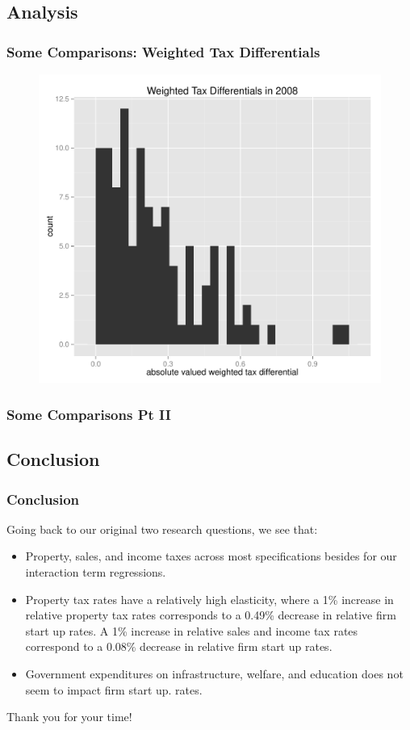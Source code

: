 \documentclass{beamer}
\begin{document}
\begin{frame}
\section{Analysis}
\frametitle{Some Comparisons: Weighted Tax Differentials}
\begin{figure}[h]\label{weightedtax}
    \centering
    \includegraphics[scale = 0.5]{../../analysis/output/_--_weightedtax.pdf}
\end{figure}
\end{frame}

\begin{frame}
\frametitle{Some Comparisons Pt II}



\end{frame}

\begin{frame}
\section{Conclusion}
\frametitle{Conclusion}
Going back to our original two research questions, we see that:
\begin{itemize}
\item Property, sales, and income taxes across most specifications besides for our interaction term regressions. 
\item Property tax rates have a relatively high elasticity, where a 1\% increase in relative property tax rates corresponds to a 0.49\% decrease in relative firm start up rates. A 1\% increase in relative sales and income tax rates correspond to a 0.08\% decrease in relative firm start up rates.
\item Government expenditures on infrastructure, welfare, and education does not seem to impact firm start up. rates.

\end{itemize}
\end{frame}

\begin{frame}
\begin{centering}
\huge{Thank you for your time!}
\end{centering}
\end{frame}
\end{document}
